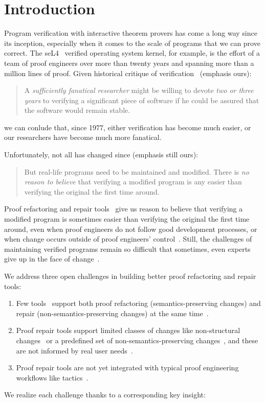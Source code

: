 \section{Introduction}

Program verification with interactive theorem provers has come a long way since its inception,
especially when it comes to the scale of programs that we can prove correct.
The seL4~\cite{Klein2009} verified operating system kernel, for example,
is the effort of a team of proof engineers over more than twenty years and spanning more than
a million lines of proof.
Given historical critique of verification~\cite{DeMillo1977} (emphasis ours):

\begin{quote}
A \textit{sufficiently fanatical researcher}
might be willing to devote \textit{two or 
three years} to verifying a significant 
piece of software if he could be 
assured that the software would remain stable.
\end{quote}
we can conlude that, since 1977, either verification has become much easier,
or our researchers have become much more fanatical.

Unfortunately, not all has changed since \citep{DeMillo1977} (emphasis still ours):

\begin{quote}
But real-life programs need to 
be maintained and modified. 
There is \textit{no reason to believe} that verifying a modified program is any 
easier than verifying the original the 
first time around.
\end{quote}
Proof refactoring and repair tools~\cite{wibergh2019, WhitesidePhD, Dietrich2013,
adams2015, Bourke12, Roe2016, robert2018, pumpkinpatch} give us reason to believe
that verifying a modified program is sometimes easier than verifying the original the first time
around, even when proof engineers do not follow good development processes,
or when change occurs outside of proof engineers' control~\cite{PGL-045}.
Still, the challenges of maintaining verified programs remain so difficult that
sometimes, even experts give up in the face of change~\cite{replica}.

We address three open challenges in building better proof refactoring and repair tools:

\begin{enumerate}
\item Few tools~\cite{robert2018, wibergh2019} support both proof refactoring (semantics-preserving changes) and repair (non-semantics-preserving changes) at the same time~\cite{PGL-045}.
\item Proof repair tools support limited classes of changes like non-structural changes~\cite{pumpkinpatch} or a predefined set
of non-semantics-preserving changes~\cite{robert2018, wibergh2019}, and these are not informed by real user needs~\cite{replica}.
\item Proof repair tools are not yet integrated with typical proof engineering workflows like tactics~\cite{PGL-045, pumpkinpatch, robert2018}.
\end{enumerate}
We realize each challenge thanks to a corresponding key insight: %

